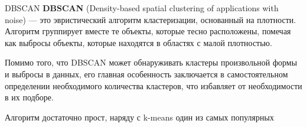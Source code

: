 \documentclass[unicode, notheorems, handout]{beamer}
\begin{document}
\begin{frame}{DBSCAN}
\textbf{DBSCAN} (Density-based spatial clustering of applications with noise) --- это эвристический алгоритм кластеризации, основанный на плотности. Алгоритм группирует вместе те объекты, которые тесно расположены, помечая как выбросы объекты, которые находятся в областях с малой плотностью.
\vspace{1ex}

Помимо того, что DBSCAN может обнаруживать кластеры произвольной формы и выбросы в данных, его главная особенность заключается в самостоятельном определении необходимого количества кластеров, что избавляет от необходимости в их подборе.
\vspace{1ex}

Алгоритм достаточно прост, наряду с k-means один из самых популярных
\end{frame}
\end{document}
